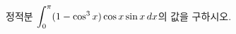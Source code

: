 \hspace*{2mm}\begin{minipage}[t]{\dimexpr\linewidth-2mm\relax}\vspace{0pt}
정적분 $\displaystyle\int_{0}^{\pi}(1-\cos^3 x)\cos x\sin x\mkern3mu dx$의 값을 구하시오.\end{minipage}

